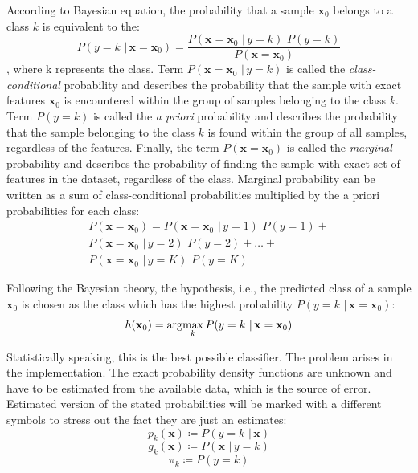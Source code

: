 According to Bayesian equation, the probability that a sample $\mathbf{x}_0$ belongs to a class $k$ is equivalent to the: 
\begin{equation} 
P(y=k \,\, | \, \mathbf{x}=\mathbf{x}_0) = \frac{P(\mathbf{x}=\mathbf{x}_0  \,\, | \, y=k) \,\,P(y=k)} {P(\mathbf{x}=\mathbf{x}_0)}
\end{equation}
\noindent
, where k represents the class. Term $P(\mathbf{x}=\mathbf{x}_0  \,\, | \, y=k)$ is called the \emph{class-conditional} probability and describes the probability that the sample with exact features $\mathbf{x}_0$ is encountered within the group of samples belonging to the class $k$. Term $P(y=k)$ is called the \emph{a priori} probability and describes the probability that the sample belonging to the class $k$ is found within the group of all samples, regardless of the features. Finally, the term $P(\mathbf{x}=\mathbf{x}_0)$ is called the \emph{marginal} probability and describes the probability of finding the sample with exact set of features in the dataset, regardless of the class. Marginal probability can be written as a sum of class-conditional probabilities multiplied by the a priori probabilities for each class:
\begin{equation}
\begin{split}
P(\mathbf{x}=\mathbf{x}_0) = P(\mathbf{x}=\mathbf{x}_0  \,\, | \, y=1) \,\,P(y=1) + \\
P(\mathbf{x}=\mathbf{x}_0  \,\, | \, y=2) \,\,P(y=2) + \dots + \\
P(\mathbf{x}=\mathbf{x}_0  \,\, | \, y=K) \,\,P(y=K)
\end{split}
\end{equation}

Following the Bayesian theory, the hypothesis, i.e., the predicted class of a sample $\mathbf{x}_0$ is chosen as the class which has the highest probability $P(y=k \,\, | \, \mathbf{x}=\mathbf{x}_0)$:
\begin{equation} 
h(\mathbf{x}_0) = \arg\!\max_k P(y=k \,\, | \, \mathbf{x}=\mathbf{x}_0)
\end{equation}

Statistically speaking, this is the best possible classifier. The problem arises in the implementation. The exact probability density functions are unknown and have to be estimated from the available data, which is the source of error.
Estimated version of the stated probabilities will be marked with a different symbols to stress out the fact they are just an estimates:
\begin{equation} 
p_k(\mathbf{x}) \coloneqq P(y=k \,\, | \, \mathbf{x})
\end{equation}
\begin{equation} 
g_k(\mathbf{x}) \coloneqq P(\mathbf{x}  \,\, | \, y=k)
\end{equation}
\begin{equation} 
\pi_k \coloneqq P(y=k)
\end{equation}


